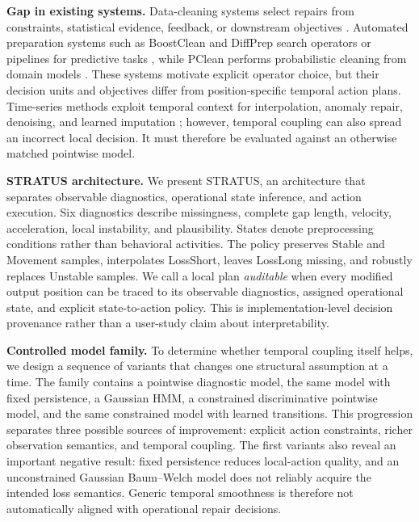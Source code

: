 \documentclass[sigconf,review]{acmart}
\newcommand{\STRATUS}{\textsc{STRATUS}\xspace}
\begin{document}
\textbf{Gap in existing systems.} Data-cleaning systems select repairs from constraints, statistical evidence, feedback, or downstream objectives \cite{rekatsinas2017holoclean,krishnan2016activeclean}. Automated preparation systems such as BoostClean and DiffPrep search operators or pipelines for predictive tasks \cite{krishnan2017boostclean,li2023diffprep}, while PClean performs probabilistic cleaning from domain models \cite{lew2021pclean}. These systems motivate explicit operator choice, but their decision units and objectives differ from position-specific temporal action plans. Time-series methods exploit temporal context for interpolation, anomaly repair, denoising, and learned imputation \cite{wang2020survey,zhang2017timeseries,cao2018brits}; however, temporal coupling can also spread an incorrect local decision. It must therefore be evaluated against an otherwise matched pointwise model.

\textbf{STRATUS architecture.} We present \STRATUS, an architecture that separates observable diagnostics, operational state inference, and action execution. Six diagnostics describe missingness, complete gap length, velocity, acceleration, local instability, and plausibility. States denote preprocessing conditions rather than behavioral activities. The policy preserves Stable and Movement samples, interpolates LossShort, leaves LossLong missing, and robustly replaces Unstable samples. We call a local plan \emph{auditable} when every modified output position can be traced to its observable diagnostics, assigned operational state, and explicit state-to-action policy. This is implementation-level decision provenance rather than a user-study claim about interpretability.

\textbf{Controlled model family.} To determine whether temporal coupling itself helps, we design a sequence of variants that changes one structural assumption at a time. The family contains a pointwise diagnostic model, the same model with fixed persistence, a Gaussian HMM, a constrained discriminative pointwise model, and the same constrained model with learned transitions. This progression separates three possible sources of improvement: explicit action constraints, richer observation semantics, and temporal coupling. The first variants also reveal an important negative result: fixed persistence reduces local-action quality, and an unconstrained Gaussian Baum--Welch model does not reliably acquire the intended loss semantics. Generic temporal smoothness is therefore not automatically aligned with operational repair decisions.
\end{document}
